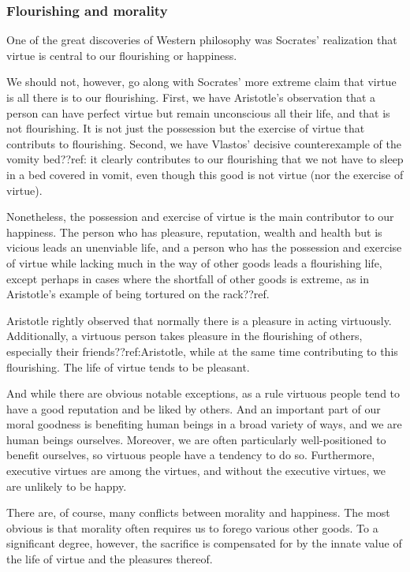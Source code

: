 \subsubsection{Flourishing and morality}
One of the great discoveries of Western philosophy was Socrates' realization that virtue is central to our flourishing
or happiness. 

We should not, however, go along with Socrates' more extreme claim that virtue is all there is to our flourishing. 
First, we have Aristotle's observation that a person can have perfect virtue but remain unconscious all their life,
and that is not flourishing. It is not just the possession but the exercise of virtue that contributs to flourishing.
Second, we have Vlastos' decisive counterexample of the vomity bed??ref: it clearly contributes to our flourishing that 
we not have to sleep in a bed covered in vomit, even though this good is not virtue (nor the exercise of virtue).

Nonetheless, the possession and exercise of virtue is the main contributor to our happiness. The person who
has pleasure, reputation, wealth and health but is vicious leads an unenviable life, and a person who has
the possession and exercise of virtue while lacking much in the way of other goods leads a flourishing life,
except perhaps in cases where the shortfall of other goods is extreme, as in Aristotle's example of being tortured
on the rack??ref. 

Aristotle rightly observed that normally there is a pleasure in acting virtuously. Additionally, a virtuous 
person takes pleasure in the flourishing of others, especially their friends??ref:Aristotle, while at the same time 
contributing to this flourishing. The life of virtue tends to be pleasant.

And while there are obvious notable exceptions, as a rule virtuous people tend to have a good reputation and be liked
by others. And an important part of our moral goodness is benefiting human beings in a broad variety of ways, and we 
are human beings ourselves. Moreover, we are often particularly well-positioned to benefit ourselves, so virtuous people
have a tendency to do so. Furthermore, executive virtues are among the virtues, and without the executive virtues, we are 
unlikely to be happy.

There are, of course, many conflicts between morality and happiness. The most obvious is that morality often requires
us to forego various other goods. To a significant degree, however, the sacrifice is compensated for by the innate value
of the life of virtue and the pleasures thereof. 

